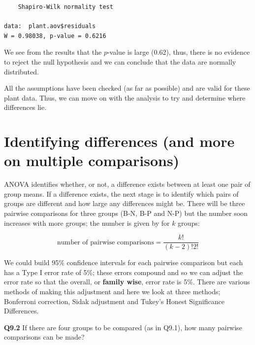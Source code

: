 \documentclass[
  oneside]{krantz}
\newenvironment{Shaded}{\begin{snugshade}}{\end{snugshade}}
\newcommand{\FunctionTok}[1]{\textcolor[rgb]{0.00,0.00,0.00}{#1}}
\newcommand{\NormalTok}[1]{#1}
\newcommand{\SpecialCharTok}[1]{\textcolor[rgb]{0.00,0.00,0.00}{#1}}
\begin{document}
\begin{Shaded}
\end{Shaded}

\begin{verbatim}
    Shapiro-Wilk normality test

data:  plant.aov$residuals
W = 0.98038, p-value = 0.6216
\end{verbatim}

We see from the results that the \(p\)-value is large (0.62), thus, there is no evidence to reject the null hypothesis and we can conclude that the data are normally distributed.

All the assumptions have been checked (as far as possible) and are valid for these plant data. Thus, we can move on with the analysis to try and determine where differences lie.

\hypertarget{identifying-differences-and-more-on-multiple-comparisons}{%
\section{Identifying differences (and more on multiple comparisons)}\label{identifying-differences-and-more-on-multiple-comparisons}}

ANOVA identifies whether, or not, a difference exists between at least one pair of group means. If a difference exists, the next stage is to identify which pairs of groups are different and how large any differences might be. There will be three pairwise comparisons for three groups (B-N, B-P and N-P) but the number soon increases with more groups; the number is given by for \(k\) groups:

\[\textrm{number of pairwise comparisons} = \frac{k!}{(k-2)!2!}\]

We could build 95\% confidence intervals for each pairwise comparison but each has a Type I error rate of 5\%; these errors compound and so we can adjust the error rate so that the overall, or \textbf{family wise}, error rate is 5\%. There are various methods of making this adjustment and here we look at three methods; Bonferroni correction, Sidak adjustment and Tukey's Honest Significance Differences.

\textbf{Q9.2} If there are four groups to be compared (as in Q9.1), how many pairwise comparisons can be made?
\end{document}
